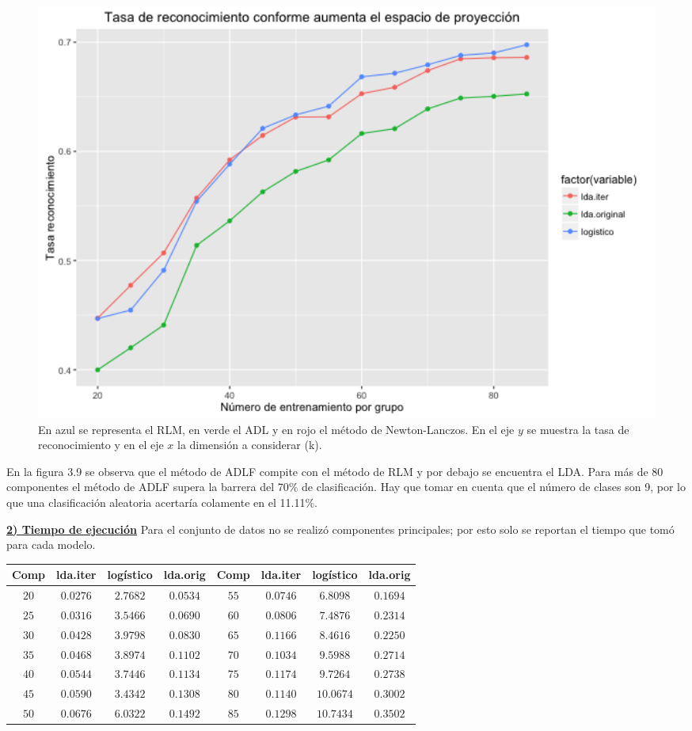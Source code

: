 \begin{figure}[!ht]
  \centering
  \includegraphics[width=1\textwidth]{Figures/Chapter4_comp_Otto.png} 
  \caption[Tasa de reconocimiento de los 3 métodos (Otto Group)]
  {En azul se representa el RLM, en verde el ADL y en rojo el método de Newton-Lanczos. En el eje $y$ se muestra la tasa de reconocimiento y en el eje $x$ la dimensión a considerar (k).}
\end{figure}

En la figura 3.9 se observa que el método de ADLF compite con el método de RLM y por debajo se encuentra el LDA. Para más de 80 componentes el método de ADLF supera la barrera del 70\% de clasificación. Hay que tomar en cuenta que el número de clases son 9, por lo que una clasificación aleatoria acertaría colamente en el 11.11\%.

\pagebreak
\underline{\textbf{2) Tiempo de ejecución}}
Para el conjunto de datos no se realizó componentes principales; por esto solo se reportan el tiempo que tomó para cada modelo.

\begin{center}
\begin{tabular}{ | c | c | c | c | c | c | c | c |} 
\hline
Comp & lda.iter & logístico & lda.orig   & Comp & lda.iter & logístico & lda.orig   \\ 
\hline
\hline
$20$ & $0.0276$ & $2.7682$ & $0.0534$ & $55$ & $0.0746$ & $6.8098$ & $0.1694$ \\
$25$ & $0.0316$ & $3.5466$ & $0.0690$ & $60$ & $0.0806$ & $7.4876$ & $0.2314$ \\
$30$ & $0.0428$ & $3.9798$ & $0.0830$ & $65$ & $0.1166$ & $8.4616$ & $0.2250$ \\
$35$ & $0.0468$ & $3.8974$ & $0.1102$ & $70$ & $0.1034$ & $9.5988$ & $0.2714$ \\
$40$ & $0.0544$ & $3.7446$ & $0.1134$ & $75$ & $0.1174$ & $9.7264$ & $0.2738$ \\
$45$ & $0.0590$ & $3.4342$ & $0.1308$ & $80$ & $0.1140$ & $10.0674$ & $0.3002$ \\
$50$ & $0.0676$ & $6.0322$ & $0.1492$ & $85$ & $0.1298$ & $10.7434$ & $0.3502$ \\
\hline
\hline
\end{tabular}
\end{center}

